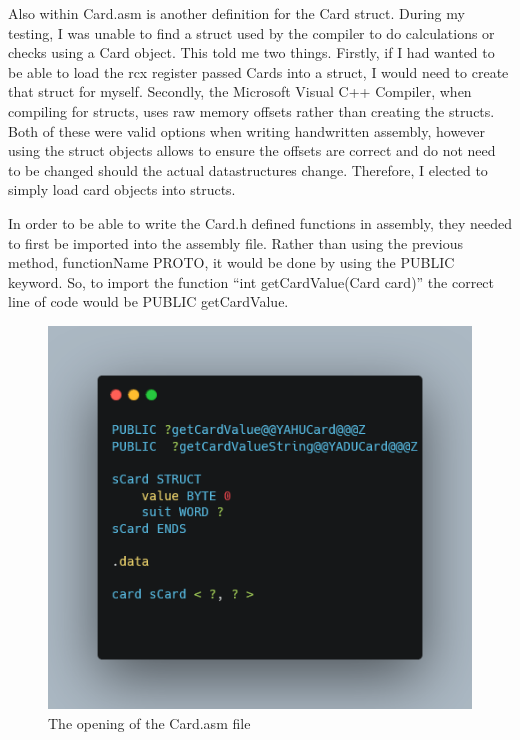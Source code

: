\documentclass[twoside]{article}
\begin{document}
    \bigbreak
    \noindent
    Also within Card.asm is another definition for the Card struct.
    During my testing, I was unable to find a struct used by the compiler to do calculations or checks using a Card object.
    This told me two things.
    Firstly, if I had wanted to be able to load the rcx register passed Cards into a struct, I would need to create that struct for myself.
    Secondly, the Microsoft Visual C++ Compiler, when compiling for structs, uses raw memory offsets rather than creating the structs.
    Both of these were valid options when writing handwritten assembly, however using the struct objects allows to ensure the offsets are correct and do not need to be changed should the actual datastructures change.
    Therefore, I elected to simply load card objects into structs.

    \bigbreak
    \noindent
    In order to be able to write the Card.h defined functions in assembly, they needed to first be imported into the assembly file.
    Rather than using the previous method, functionName PROTO, it would be done by using the PUBLIC keyword.
    So, to import the function ``int getCardValue(Card card)'' the correct line of code would be PUBLIC getCardValue.

    \begin{figure}[hbtp]
        \centering
        \includegraphics[scale=0.4]{Cardasm}
        \caption {The opening of the Card.asm file}
        \label{fig:Cardasm}
    \end{figure}
\end{document}
